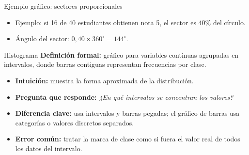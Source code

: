 \documentclass[aspectratio=169,11pt]{beamer}
\newcommand{\pregunta}[1]{\textbf{Pregunta que responde:} \emph{#1}}
\newcommand{\errorcomun}[1]{\textbf{Error común:} #1}
\newcommand{\diferencia}[1]{\textbf{Diferencia clave:} #1}
\begin{document}
\begin{frame}{Ejemplo gráfico: sectores proporcionales}
\centering
{}
\vspace{0.4em}
\begin{itemize}
  \item Ejemplo: si 16 de 40 estudiantes obtienen nota 5, el sector es $40\%$ del círculo.
  \item Ángulo del sector: $0{,}40\times 360^\circ=144^\circ$.
\end{itemize}
\end{frame}

\begin{frame}{Histograma}
\textbf{Definición formal:} gráfico para variables continuas agrupadas en intervalos, donde barras contiguas representan frecuencias por clase.
\begin{itemize}
  \item \textbf{Intuición:} muestra la forma aproximada de la distribución.
  \item \pregunta{¿En qué intervalos se concentran los valores?}
  \item \diferencia{usa intervalos y barras pegadas; el gráfico de barras usa categorías o valores discretos separados.}
  \item \errorcomun{tratar la marca de clase como si fuera el valor real de todos los datos del intervalo.}
\end{itemize}
\end{frame}
\end{document}
